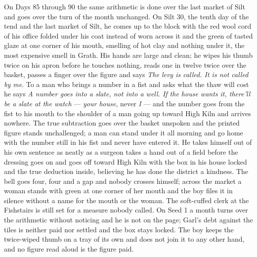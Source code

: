 \documentclass{design/chronicle}
\begin{document}
{On Days 85 through 90 the same arithmetic is done over the last market of Silt and goes over the turn of the month unchanged. On Silt 30, the tenth day of the tend and the last market of Silt, he comes up to the block with the red wool cord of his office folded under his coat instead of worn across it and the green of tasted glaze at one corner of his mouth, smelling of hot clay and nothing under it, the most expensive smell in Grath. His hands are large and clean; he wipes his thumb twice on his apron before he touches nothing, reads one in twelve twice over the basket, passes a finger over the figure and says \emph{The levy is called. It is not called by me}. To a man who brings a number in a fist and asks what the thaw will cost he says \emph{A number goes into a slate, not into a well. If the house wants it, there’ll be a slate at the watch} --- \emph{your house}, never \emph{I} --- and the number goes from the fist to his mouth to the shoulder of a man going up toward High Kiln and arrives nowhere. The true subtraction goes over the basket unspoken and the printed figure stands unchallenged; a man can stand under it all morning and go home with the number still in his fist and never have entered it. He takes himself out of his own sentence as neatly as a surgeon takes a hand out of a field before the dressing goes on and goes off toward High Kiln with the box in his house locked and the true deduction inside, believing he has done the district a kindness. The bell goes four, four and a gap and nobody crosses himself; across the market a woman stands with green at one corner of her mouth and the boy files it in silence without a name for the mouth or the woman. The soft-cuffed clerk at the Fishstairs is still set for a measure nobody called. On Seed 1 a month turns over the arithmetic without noticing and he is not on the page; Garl’s debt against the tiles is neither paid nor settled and the box stays locked. The boy keeps the twice-wiped thumb on a tray of its own and does not join it to any other hand, and no figure read aloud is the figure paid.

}
\end{document}
